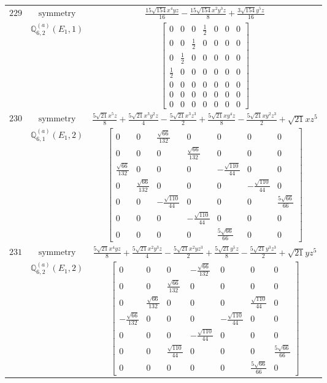 \documentclass[fleqn,8pt,landscape]{jsarticle}
\begin{document}
\begin{longtable}{ccc}
$ 229 $ & $ \text{symmetry} $ & $ \frac{15 \sqrt{154} x^{4} y z}{16} - \frac{15 \sqrt{154} x^{2} y^{3} z}{8} + \frac{3 \sqrt{154} y^{5} z}{16} $ \\
$  $ & $ \mathbb{Q}_{6,2}^{(a)}(E_{1},1) $ & $ \begin{bmatrix} 0 & 0 & 0 & \frac{1}{2} & 0 & 0 & 0 \\ 0 & 0 & \frac{1}{2} & 0 & 0 & 0 & 0 \\ 0 & \frac{1}{2} & 0 & 0 & 0 & 0 & 0 \\ \frac{1}{2} & 0 & 0 & 0 & 0 & 0 & 0 \\ 0 & 0 & 0 & 0 & 0 & 0 & 0 \\ 0 & 0 & 0 & 0 & 0 & 0 & 0 \\ 0 & 0 & 0 & 0 & 0 & 0 & 0 \end{bmatrix} $ \\ \hline
$ 230 $ & $ \text{symmetry} $ & $ \frac{5 \sqrt{21} x^{5} z}{8} + \frac{5 \sqrt{21} x^{3} y^{2} z}{4} - \frac{5 \sqrt{21} x^{3} z^{3}}{2} + \frac{5 \sqrt{21} x y^{4} z}{8} - \frac{5 \sqrt{21} x y^{2} z^{3}}{2} + \sqrt{21} x z^{5} $ \\
$  $ & $ \mathbb{Q}_{6,1}^{(a)}(E_{1},2) $ & $ \begin{bmatrix} 0 & 0 & \frac{\sqrt{66}}{132} & 0 & 0 & 0 & 0 \\ 0 & 0 & 0 & \frac{\sqrt{66}}{132} & 0 & 0 & 0 \\ \frac{\sqrt{66}}{132} & 0 & 0 & 0 & - \frac{\sqrt{110}}{44} & 0 & 0 \\ 0 & \frac{\sqrt{66}}{132} & 0 & 0 & 0 & - \frac{\sqrt{110}}{44} & 0 \\ 0 & 0 & - \frac{\sqrt{110}}{44} & 0 & 0 & 0 & \frac{5 \sqrt{66}}{66} \\ 0 & 0 & 0 & - \frac{\sqrt{110}}{44} & 0 & 0 & 0 \\ 0 & 0 & 0 & 0 & \frac{5 \sqrt{66}}{66} & 0 & 0 \end{bmatrix} $ \\ \hline
$ 231 $ & $ \text{symmetry} $ & $ \frac{5 \sqrt{21} x^{4} y z}{8} + \frac{5 \sqrt{21} x^{2} y^{3} z}{4} - \frac{5 \sqrt{21} x^{2} y z^{3}}{2} + \frac{5 \sqrt{21} y^{5} z}{8} - \frac{5 \sqrt{21} y^{3} z^{3}}{2} + \sqrt{21} y z^{5} $ \\
$  $ & $ \mathbb{Q}_{6,2}^{(a)}(E_{1},2) $ & $ \begin{bmatrix} 0 & 0 & 0 & - \frac{\sqrt{66}}{132} & 0 & 0 & 0 \\ 0 & 0 & \frac{\sqrt{66}}{132} & 0 & 0 & 0 & 0 \\ 0 & \frac{\sqrt{66}}{132} & 0 & 0 & 0 & \frac{\sqrt{110}}{44} & 0 \\ - \frac{\sqrt{66}}{132} & 0 & 0 & 0 & - \frac{\sqrt{110}}{44} & 0 & 0 \\ 0 & 0 & 0 & - \frac{\sqrt{110}}{44} & 0 & 0 & 0 \\ 0 & 0 & \frac{\sqrt{110}}{44} & 0 & 0 & 0 & \frac{5 \sqrt{66}}{66} \\ 0 & 0 & 0 & 0 & 0 & \frac{5 \sqrt{66}}{66} & 0 \end{bmatrix} $ \\ \hline

\end{longtable}
\end{document}
